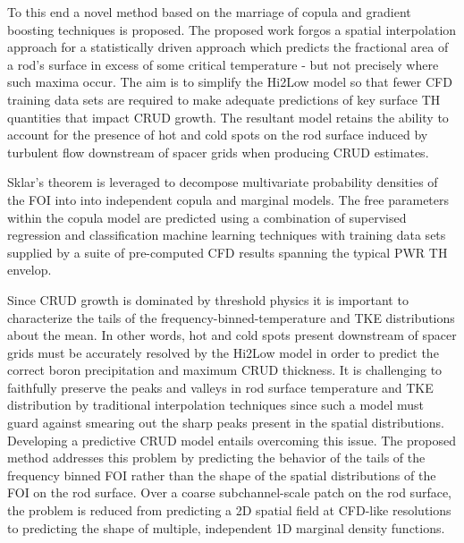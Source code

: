 To this end a novel method based on the marriage of copula and gradient
boosting techniques is proposed.  The proposed work forgos a spatial
interpolation approach for a statistically driven approach which predicts the
fractional area of a rod's surface in excess of some critical temperature - but
not precisely where such maxima occur.  The aim is to simplify the Hi2Low model
so that fewer CFD training data sets are required to make adequate predictions
of key surface TH quantities that impact CRUD growth.  The resultant model
retains the ability to account for the presence of hot and cold spots on the rod surface induced by
turbulent flow downstream of spacer grids when producing CRUD estimates.

Sklar's theorem is leveraged to decompose multivariate probability
densities of the FOI into into independent copula and marginal models. The free parameters
within the copula model are predicted using a combination of supervised
regression and classification machine learning techniques with training data
sets supplied by a suite of pre-computed CFD results spanning the typical PWR TH
envelop. 

Since CRUD growth is dominated by threshold physics
it is important to characterize the tails of the
frequency-binned-temperature and TKE distributions about the mean.  In other
words, hot and cold spots present downstream of spacer grids must be accurately
resolved by the Hi2Low model in order to predict the correct boron
precipitation and maximum CRUD thickness.
It is challenging to faithfully
preserve the peaks and valleys in rod surface temperature and TKE distribution
by traditional interpolation techniques since such a model must guard against
smearing out the sharp peaks present in the spatial distributions.  Developing
a predictive CRUD model entails overcoming this issue. The proposed method
addresses this problem by predicting the behavior of the tails of the frequency
binned FOI rather than the shape of the spatial distributions of the FOI on
the rod surface.  Over a coarse subchannel-scale patch on the rod surface, the
problem is reduced from predicting a 2D spatial field at CFD-like resolutions to
predicting the shape of multiple, independent 1D marginal density functions.
